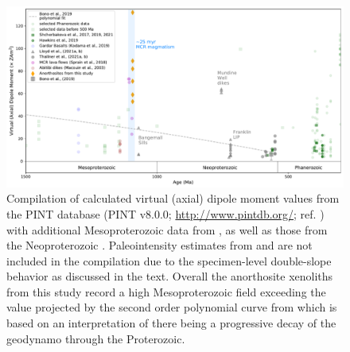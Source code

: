 \documentclass[9pt,twocolumn,twoside,lineno]{pnas-new}
\begin{document}


\begin{figure}[h!]
\noindent\includegraphics[width=17.8 cm]{PINT_compilation.pdf}
\centering
\caption{\footnotesize{Compilation of calculated virtual (axial) dipole moment values from the PINT database (PINT v8.0.0; \url{http://www.pintdb.org/}; ref. \citealp{Bono2021a}) with additional Mesoproterozoic data from \cite{Sprain2018a, Kodama2019a}, as well as those from the Neoproterozoic \cite{Lloyd2021a, Lloyd2021b, Thallner2021a, Thallner2021b}. Paleointensity estimates from \cite{Pesonen1983a} and \cite{Kulakov2013a} are not included in the compilation due to the specimen-level double-slope behavior as discussed in the text. Overall the anorthosite xenoliths from this study record a high Mesoproterozoic field exceeding the value projected by the second order polynomial curve from \cite{Bono2019a} which is based on an interpretation of there being a progressive decay of the geodynamo through the Proterozoic.}}
\label{fig:PINT_compilation}
\end{figure}
\end{document}
